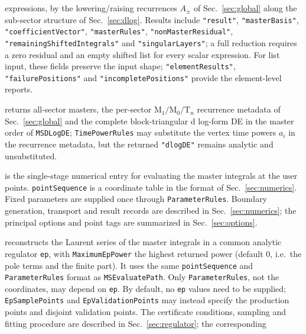 \documentclass[11pt,a4paper]{article}
\begin{document}
\begin{description}
        expressions, by
        the lowering/raising recurrences $A_\pm$ of Sec.~\ref{sec:global} along the
        sub-sector structure of Sec.~\ref{sec:dlog}. Results include
        \texttt{"result"}, \texttt{"masterBasis"}, \texttt{"coefficientVector"},
        \texttt{"masterRules"},
        \texttt{"nonMasterResidual"}, \texttt{"remainingShiftedIntegrals"} and
        \texttt{"singularLayers"}; a full reduction requires a zero residual and an empty shifted
        list for every scalar expression. For list input, these fields preserve the input
        shape; \texttt{"elementResults"}, \texttt{"failurePositions"} and
        \texttt{"incompletePositions"} provide the element-level reports.
  \item[\texttt{MSFormulaData[context]}] returns all-sector masters, the per-sector
        $\text{M}_1/\text{M}_0/\text{T}_n$ recurrence metadata of Sec.~\ref{sec:global} and the complete
        block-triangular d log-form DE in the master order of \texttt{MSDLogDE};
        \texttt{TimePowerRules} may substitute the vertex time powers $a_i$ in the recurrence
        metadata, but the returned \texttt{"dlogDE"} remains analytic and unsubstituted.
  \item[\texttt{MSEvaluatePath[context, pointSequence, opts]}] is the single-stage numerical
        entry for evaluating the master integrals at the user points.
        \texttt{pointSequence} is a coordinate table in the format of Sec.~\ref{sec:numerics}.
        Fixed parameters are supplied once through \texttt{ParameterRules}. Boundary generation,
        transport and result records are described in Sec.~\ref{sec:numerics}; the principal
        options and point tags are summarized in Sec.~\ref{sec:options}.
  \item[\texttt{MSReconstructEpSeries[context, ep, pointSequence, opts]}] reconstructs the Laurent
        series of the master integrals in a common analytic regulator \texttt{ep}, with
        \texttt{MaximumEpPower} the highest returned power (default $0$, i.e.\ the pole terms and
        the finite part). It uses the same \texttt{pointSequence} and \texttt{ParameterRules}
        format as \texttt{MSEvaluatePath}. Only \texttt{ParameterRules}, not the coordinates,
        may depend on \texttt{ep}. By default, no \texttt{ep} values need to be supplied;
        \texttt{EpSamplePoints} and \texttt{EpValidationPoints} may instead specify the production
        points and disjoint validation points. The certificate conditions,
        sampling and fitting procedure are described in Sec.~\ref{sec:regulator}; the corresponding

\end{description}
\end{document}
